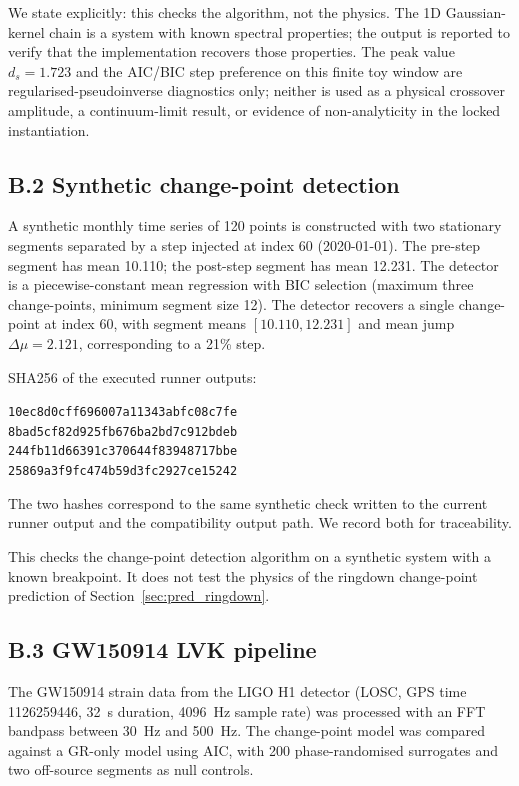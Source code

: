 ﻿\documentclass[12pt,a4paper]{article}
\theoremstyle{definition}
\begin{document}
We state explicitly: this checks the algorithm, not the physics. The 1D Gaussian-kernel chain is a system with known spectral properties; the output is reported to verify that the implementation recovers those properties. The peak value $d_s=1.723$ and the AIC/BIC step preference on this finite toy window are regularised-pseudoinverse diagnostics only; neither is used as a physical crossover amplitude, a continuum-limit result, or evidence of non-analyticity in the locked instantiation.

\subsection{B.2 Synthetic change-point detection}
\label{app:pipeline_changepoint}

A synthetic monthly time series of 120 points is constructed with two stationary segments separated by a step injected at index 60 (2020-01-01). The pre-step segment has mean 10.110; the post-step segment has mean 12.231. The detector is a piecewise-constant mean regression with BIC selection (maximum three change-points, minimum segment size 12). The detector recovers a single change-point at index 60, with segment means $[10.110,12.231]$ and mean jump $\Delta\mu = 2.121$, corresponding to a 21\% step.

SHA256 of the executed runner outputs:
\begin{center}
\texttt{10ec8d0cff696007a11343abfc08c7fe}\\
\texttt{8bad5cf82d925fb676ba2bd7c912bdeb}\\
\texttt{244fb11d66391c370644f83948717bbe}\\
\texttt{25869a3f9fc474b59d3fc2927ce15242}
\end{center}
The two hashes correspond to the same synthetic check written to the current runner output and the compatibility output path. We record both for traceability.

This checks the change-point detection algorithm on a synthetic system with a known breakpoint. It does not test the physics of the ringdown change-point prediction of Section~\ref{sec:pred_ringdown}.

\subsection{B.3 GW150914 LVK pipeline}
\label{app:pipeline_gw150914}

The GW150914 strain data from the LIGO H1 detector (LOSC, GPS time 1126259446, 32~s duration, 4096~Hz sample rate) was processed with an FFT bandpass between 30~Hz and 500~Hz. The change-point model was compared against a GR-only model using AIC, with 200 phase-randomised surrogates and two off-source segments as null controls.
\end{document}
